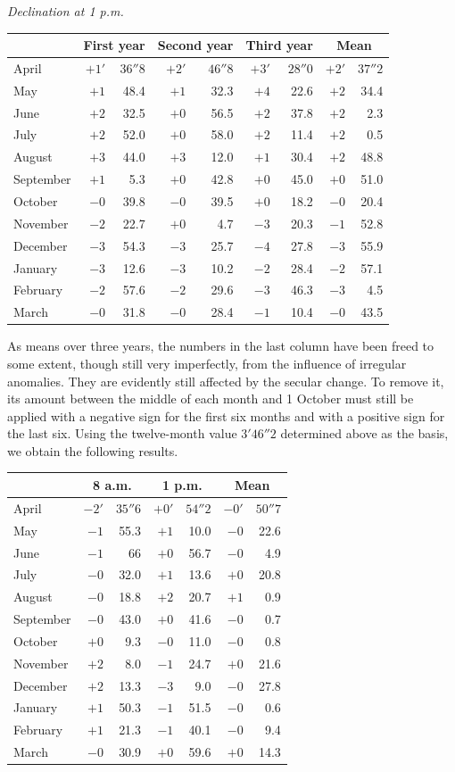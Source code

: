 \begin{center}\small
\textit{Declination at 1 p.m.}\par\smallskip
\begin{tabular}{l|rr|rr|rr||rr}
&\multicolumn{2}{c|}{First year}&\multicolumn{2}{c|}{Second year}&\multicolumn{2}{c||}{Third year}&\multicolumn{2}{c}{Mean}\\\hline
April&$+1'$&$36''8$&$+2'$&$46''8$&$+3'$&$28''0$&$+2'$&$37''2$\\
May&$+1$&48.4&$+1$&32.3&$+4$&22.6&$+2$&34.4\\
June&$+2$&32.5&$+0$&56.5&$+2$&37.8&$+2$&2.3\\
July&$+2$&52.0&$+0$&58.0&$+2$&11.4&$+2$&0.5\\
August&$+3$&44.0&$+3$&12.0&$+1$&30.4&$+2$&48.8\\
September&$+1$&5.3&$+0$&42.8&$+0$&45.0&$+0$&51.0\\
October&$-0$&39.8&$-0$&39.5&$+0$&18.2&$-0$&20.4\\
November&$-2$&22.7&$+0$&4.7&$-3$&20.3&$-1$&52.8\\
December&$-3$&54.3&$-3$&25.7&$-4$&27.8&$-3$&55.9\\
January&$-3$&12.6&$-3$&10.2&$-2$&28.4&$-2$&57.1\\
February&$-2$&57.6&$-2$&29.6&$-3$&46.3&$-3$&4.5\\
March&$-0$&31.8&$-0$&28.4&$-1$&10.4&$-0$&43.5
\end{tabular}
\end{center}
As means over three years, the numbers in the last column have been freed to some extent, though still very imperfectly, from the influence of irregular anomalies. They are evidently still affected by the secular change. To remove it, its amount between the
middle of each month and 1 October must still be applied with a negative sign for the first six months and with a positive sign for the last six. Using the twelve-month value $3'46''2$ determined above as the basis, we obtain the following results.
\begin{center}\small
\begin{tabular}{l|rr|rr||rr}
&\multicolumn{2}{c|}{8 a.m.}&\multicolumn{2}{c||}{1 p.m.}&\multicolumn{2}{c}{Mean}\\\hline
April&$-2'$&$35''6$&$+0'$&$54''2$&$-0'$&$50''7$\\
May&$-1$&55.3&$+1$&10.0&$-0$&22.6\\
June&$-1$&6\phantom{.}6&$+0$&56.7&$-0$&4.9\\
July&$-0$&32.0&$+1$&13.6&$+0$&20.8\\
August&$-0$&18.8&$+2$&20.7&$+1$&0.9\\
September&$-0$&43.0&$+0$&41.6&$-0$&0.7\\
October&$+0$&9.3&$-0$&11.0&$-0$&0.8\\
November&$+2$&8.0&$-1$&24.7&$+0$&21.6\\
December&$+2$&13.3&$-3$&9.0&$-0$&27.8\\
January&$+1$&50.3&$-1$&51.5&$-0$&0.6\\
February&$+1$&21.3&$-1$&40.1&$-0$&9.4\\
March&$-0$&30.9&$+0$&59.6&$+0$&14.3
\end{tabular}
\end{center}
